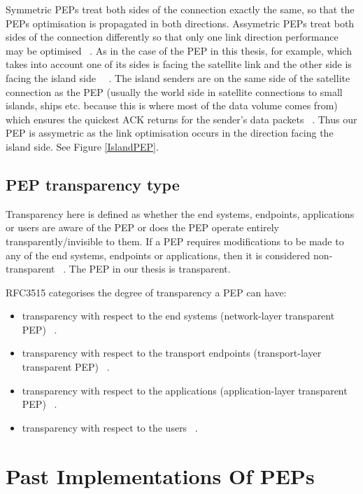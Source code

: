 Symmetric PEPs treat both sides of the connection exactly the same, so that the PEPs optimisation is propagated in both directions. Assymetric PEPs treat both sides of the connection differently so that only one link direction performance may be optimised ~\cite{6}. As in the case of the PEP in this thesis, for example, which takes into account one of its sides is facing the satellite link and the other side is facing the island side ~\cite{4}~\cite{5}.  The island senders are on the same side of the satellite connection as the PEP (usually the world side in satellite connections to small islands, ships etc. because this is where most of the data volume comes from) which ensures the quickest ACK returns for the sender's data packets ~\cite{4}. Thus our PEP is assymetric as the link optimisation occurs in the direction facing the island side. See Figure \ref{IslandPEP}.  \\

\subsection{PEP transparency type}
Transparency here is defined as whether the end systems, endpoints, applications or users are aware of the PEP or does the PEP operate entirely transparently/invisible to them. If a PEP requires modifications to be made to any of the end systems, endpoints or applications, then it is considered non-transparent ~\cite{6}. The PEP in our thesis is transparent.

RFC3515 categorises the degree of transparency a PEP can have:\\
\begin{itemize}
\item transparency with respect to the end systems (network-layer transparent PEP) ~\cite{6}.
\item transparency with respect to the transport endpoints (transport-layer transparent PEP) ~\cite{6}.
\item transparency with respect to the applications (application-layer transparent PEP) ~\cite{6}.
\item transparency with respect to the users ~\cite{6}.\\
\end{itemize}

        
\section{Past Implementations Of PEPs}

